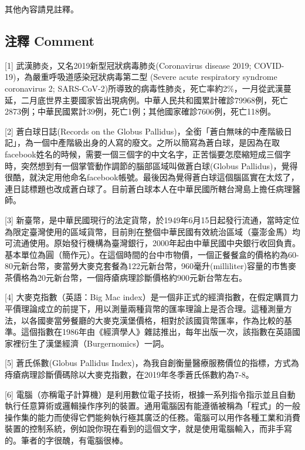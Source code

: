 \documentclass[a5paper, 12pt
]{book}
\begin{document}
其他內容請見註釋。

\hypertarget{ux6ce8ux91cb-comment}{%
\subsection{注釋 Comment}\label{ux6ce8ux91cb-comment}}

{[}1{]} 武漢肺炎，又名2019新型冠狀病毒肺炎(Coronavirus disease 2019;
COVID-19)，為嚴重呼吸道感染冠狀病毒第二型 (Severe acute respiratory
syndrome coronavirus 2;
SARS-CoV-2)所導致的病毒性肺炎，死亡率約2\%，一月從武漢蔓延，二月底世界主要國家皆出現病例。中華人民共和國累計確診79968例，死亡2873例；中華民國累計39例，死亡1例；其他國家確診7606例，死亡118例。

{[}2{]} 蒼白球日誌(Records on the Globus
Pallidus)，全銜「蒼白無味的中產階級日記」，為一個中產階級出身的人寫的廢文。之所以簡寫為蒼白球，是因為在取facebook姓名的時候，需要一個三個字的中文名字，正苦惱要怎麼縮短成三個字時，突然想到有一個掌管動作調節的腦部區域叫做蒼白球(Globus
Pallidus)，覺得很酷，就決定用他命名facebook帳號。最後因為覺得蒼白球這個腦區實在太炫了，連日誌標題也改成蒼白球了。目前蒼白球本人在中華民國所轄台灣島上擔任病理醫師。

{[}3{]}
新臺幣，是中華民國現行的法定貨幣，於1949年6月15日起發行流通，當時定位為限定臺灣使用的區域貨幣，目前則在整個中華民國有效統治區域（臺澎金馬）均可流通使用。原始發行機構為臺灣銀行，2000年起由中華民國中央銀行收回負責。基本單位為圓（簡作元）。在這個時間的台中市物價，一個正餐餐盒的價格約為60-80元新台幣，麥當勞大麥克套餐為122元新台幣，960毫升(milliliter)容量的市售麥茶價格為20元新台幣，一個痔瘡病理診斷價格約900元新台幣左右。

{[}4{]} 大麥克指數（英語：Big Mac
index）是一個非正式的經濟指數，在假定購買力平價理論成立的前提下，用以測量兩種貨幣的匯率理論上是否合理。這種測量方法，以各國麥當勞餐廳的大麥克漢堡價格，相對於該國貨幣匯率，作為比較的基準。這個指數在1986年由《經濟學人》雜誌推出，每年出版一次，該指數在英語國家裡衍生了漢堡經濟（Burgernomics）一詞。

{[}5{]} 蒼氏係數(Globus Pallidus
Index)，為我自創衡量醫療服務價位的指標，方式為痔瘡病理診斷價碼除以大麥克指數，在2019年冬季蒼氏係數約為7-8。

{[}6{]}
電腦（亦稱電子計算機）是利用數位電子技術，根據一系列指令指示並且自動執行任意算術或邏輯操作序列的裝置。通用電腦因有能遵循被稱為「程式」的一般操作集的能力而使得它們能夠執行極其廣泛的任務。電腦可以用作各種工業和消費裝置的控制系統，例如說你現在看到的這個文字，就是使用電腦輸入，而非手寫的。筆者的字很醜，有電腦很棒。
\end{document}
